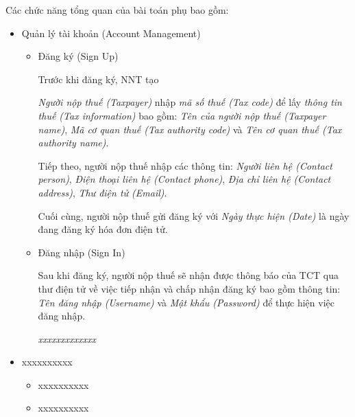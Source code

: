 Các chức năng tổng quan của bài toán phụ bao gồm:

\begin{itemize}

\item Quản lý tài khoản (Account Management)

\begin{itemize}

\item Đăng ký (Sign Up)

Trước khi đăng ký, NNT tạo  

\emph{Người nộp thuế (Taxpayer)} nhập \emph{mã số thuế (Tax code)} để lấy \emph{thông tin thuế (Tax information)} bao gồm: \emph{Tên của người nộp thuế (Taxpayer name)}, \emph{Mã cơ quan thuế (Tax authority code)} và \emph{Tên cơ quan thuế (Tax authority name)}.

Tiếp theo, người nộp thuế nhập các thông tin: \emph{Người liên hệ (Contact person)}, \emph{Điện thoại liên hệ (Contact phone)}, \emph{Địa chỉ liên hệ (Contact address)}, \emph{Thư điện tử (Email)}.

Cuối cùng, người nộp thuế gửi đăng ký với \emph{Ngày thực hiện (Date)} là ngày đang đăng ký hóa đơn điện tử.

\item Đăng nhập (Sign In)

Sau khi đăng ký, người nộp thuế sẽ nhận được thông báo của TCT qua thư điện tử về việc tiếp nhận và chấp nhận đăng ký bao gồm thông tin: \emph{Tên đăng nhập (Username)} và \emph{Mật khẩu (Password)} để thực hiện việc đăng nhập.

\emph{xxxxxxxxxxxxx}

\end{itemize}

\item xxxxxxxxxx

\begin{itemize}

\item xxxxxxxxxx

\item xxxxxxxxxx

\end{itemize}

\end{itemize}




